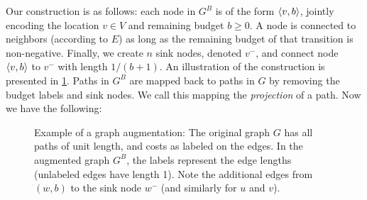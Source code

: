 Our construction is as follows: each node in $G^B$ is of the form $\langle v,b\rangle$, jointly encoding the location $v\in V$ and remaining budget $b\geq 0$.
A node is connected to neighbors (according to $E$) as long as the remaining budget of that transition is non-negative.
Finally, we create $n$ sink nodes, denoted $v^-$, and connect node $\langle v,b\rangle$ to $v^-$ with length $1/(b+1)$.
An illustration of the construction is presented in \cref{fig:augmented}.
Paths in $G^B$ are mapped back to paths in $G$ by removing the budget labels and sink nodes.
We call this mapping the \emph{projection} of a path.
Now we have the following:


\begin{figure}
	
	\caption{Example of a graph augmentation: The original graph $G$ has all paths of unit length, and costs as labeled on the edges. In the augmented graph $G^B$, the labels represent the edge lengths (unlabeled edges have length 1). Note the additional edges from $(w,b)$ to the sink node $w^-$ (and similarly for $u$ and $v$). 
	}
	\label{fig:augmented}
\end{figure}




